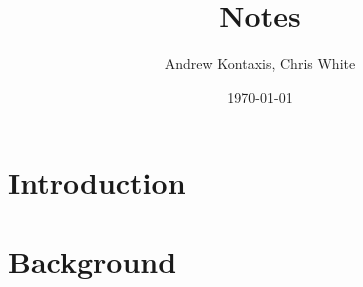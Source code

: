 \documentclass[11pt,a4paper]{article}
\title{Notes}
\author{Andrew Kontaxis, Chris White}
\date{\today}
\begin{document}
\maketitle

\section{Introduction}
\section{Background}
\end{document}
